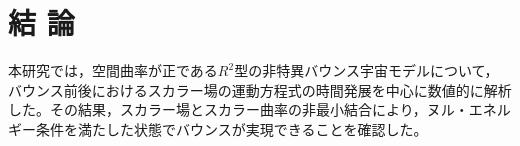 \section{結 論}
本研究では，空間曲率が正である$R^2$型の非特異バウンス宇宙モデルについて，バウンス前後におけるスカラー場の運動方程式の時間発展を中心に数値的に解析した。その結果，スカラー場とスカラー曲率の非最小結合により，ヌル・エネルギー条件を満たした状態でバウンスが実現できることを確認した。